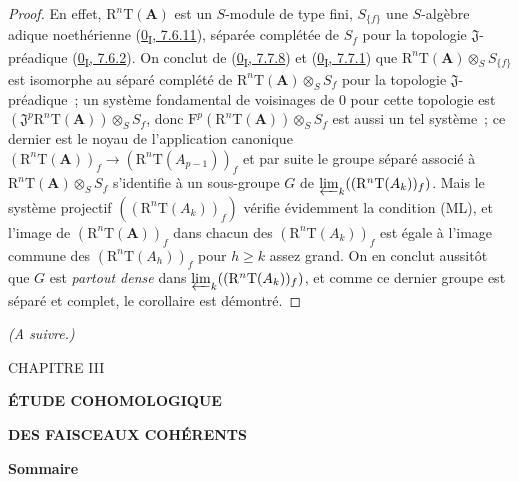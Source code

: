 \begin{proof}
En effet, $\mathrm R^n\mathrm T(\mathbf A)$ est un $S$-module de type fini,
$S_{\{f\}}$ une $S$-algèbre adique noethérienne
(\hyperref[0.7.6.11-fr]{0\textsubscript{I}, 7.6.11}), séparée complétée de
$S_f$ pour la topologie $\mathfrak J$-préadique
(\hyperref[0.7.6.2-fr]{0\textsubscript{I}, 7.6.2}). On conclut de
(\hyperref[0.7.7.8-fr]{0\textsubscript{I}, 7.7.8}) et
(\hyperref[0.7.7.1-fr]{0\textsubscript{I}, 7.7.1}) que
$\mathrm R^n\mathrm T(\mathbf A)\otimes_S S_{\{f\}}$ est isomorphe au séparé
complété de $\mathrm R^n\mathrm T(\mathbf A)\otimes_S S_f$ pour la topologie
$\mathfrak J$-préadique~; un système fondamental de voisinages de $0$ pour
cette topologie est
$(\mathfrak J^p\mathrm R^n\mathrm T(\mathbf A))\otimes_S S_f$, donc
$\mathrm F^p(\mathrm R^n\mathrm T(\mathbf A))\otimes_S S_f$ est aussi un tel
système~; ce dernier est le noyau de l'application canonique
$(\mathrm R^n\mathrm T(\mathbf A))_f\to
(\mathrm R^n\mathrm T(A_{p-1}))_f$ et par suite le groupe séparé associé à
$\mathrm R^n\mathrm T(\mathbf A)\otimes_S S_f$ s'identifie à un sous-groupe
$G$ de $\varprojlim_k((\mathrm R^n\mathrm T(A_k))_f)$. Mais le système
projectif $((\mathrm R^n\mathrm T(A_k))_f)$ vérifie évidemment la condition
(ML), et l'image de $(\mathrm R^n\mathrm T(\mathbf A))_f$ dans chacun des
$(\mathrm R^n\mathrm T(A_k))_f$ est égale à l'image commune des
$(\mathrm R^n\mathrm T(A_h))_f$ pour $h\geq k$ assez grand. On en conclut
aussitôt que $G$ est \emph{partout dense} dans
$\varprojlim_k((\mathrm R^n\mathrm T(A_k))_f)$, et comme ce dernier groupe est
séparé et complet, le corollaire est démontré.
\end{proof}

\begin{flushright}
\textit{(A suivre.)}
\end{flushright}

\clearpage
\thispagestyle{empty}
\null
\clearpage
\thispagestyle{plain}
\label{chapter:III-fr}

\begin{center}
{\large CHAPITRE III\par}
\vspace{1.5em}
{\Large\bfseries ÉTUDE COHOMOLOGIQUE\par}
{\Large\bfseries DES FAISCEAUX COHÉRENTS\par}
\vspace{1.8em}
{\bfseries Sommaire\par}
\end{center}

